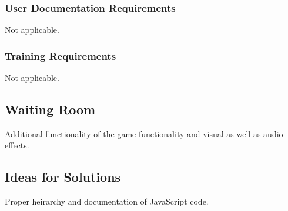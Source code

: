\documentclass[11pt, oneside]{article}   	%
\begin{document}
\subsubsection*{User Documentation Requirements}
Not applicable.


\subsubsection*{Training Requirements}
Not applicable.


\subsection*{Waiting Room}
Additional functionality of the game functionality and visual as well as audio effects.


\subsection*{Ideas for Solutions}
Proper heirarchy and documentation of JavaScript code.


\end{document}
